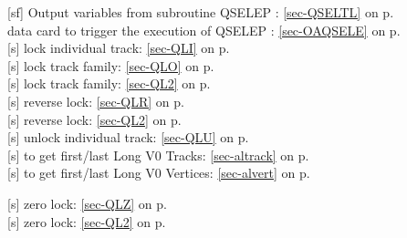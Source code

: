  [sf] Output variables from subroutine QSELEP : \ref{sec-QSELTL} on p.~\pageref{sec-QSELTL}\\
  data card to trigger the execution of QSELEP : \ref{sec-OAQSELE} on p.~\pageref{sec-OAQSELE}\\
 [s] lock individual track: \ref{sec-QLI} on p.~\pageref{sec-QLI}\\
 [s] lock track family: \ref{sec-QLO} on p.~\pageref{sec-QLO}\\
 [s] lock track family: \ref{sec-QL2} on p.~\pageref{sec-QL2}\\
 [s] reverse lock: \ref{sec-QLR} on p.~\pageref{sec-QLR}\\
 [s] reverse lock: \ref{sec-QL2} on p.~\pageref{sec-QL2}\\
 [s] unlock individual track: \ref{sec-QLU} on p.~\pageref{sec-QLU}\\
 [s] to get first/last Long V0 Tracks: \ref{sec-altrack} on p.~\pageref{sec-altrack}\\
 [s] to get first/last Long V0 Vertices: \ref{sec-alvert} on p.~\pageref{sec-alvert}
 
 [s] zero lock: \ref{sec-QLZ} on p.~\pageref{sec-QLZ}\\
 [s] zero lock: \ref{sec-QL2} on p.~\pageref{sec-QL2}
 
